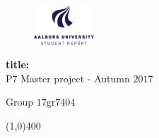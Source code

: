 \clearpage
\thispagestyle{empty}

\begin{figure}[H]
	\raggedleft
	\includegraphics[width=0.2\textwidth]{figures/aaulogo-en.png}
\end{figure} 

\vspace{5 cm}

\begin{center}
	\begin{Huge}
		\textbf{title:}\\
		\vspace{5 mm}
		P$7$ Master project - Autumn $2017$\\
		\vspace{3 mm}
	\end{Huge}
	{\Large Group $17$gr$7404$}
\end{center}
\vspace*{\fill}

\begin{center}
	\line(1,0){400}
\end{center}

